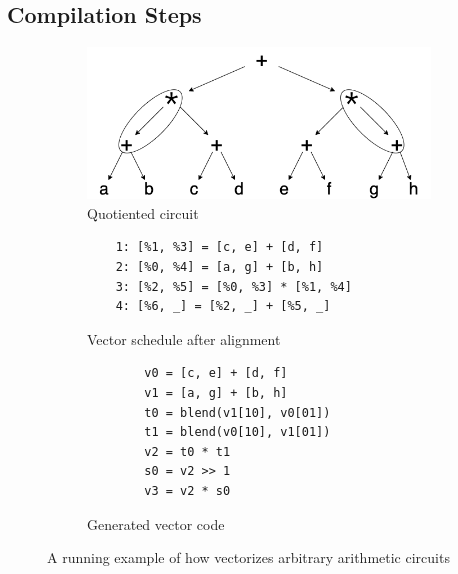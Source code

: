 \subsection*{Compilation Steps}
\begin{figure}
    \begin{subfigure}{0.6\columnwidth}
        \includegraphics[width=0.9\linewidth]{figures/compilation_overview/running_example_quotiented.drawio.png}
        \caption{Quotiented circuit}
        \label{fig:quotient-circuit}
    \end{subfigure}
    \begin{subfigure}{0.45\columnwidth}
        \begin{verbatim}
    1: [%1, %3] = [c, e] + [d, f]
    2: [%0, %4] = [a, g] + [b, h]
    3: [%2, %5] = [%0, %3] * [%1, %4]
    4: [%6, _] = [%2, _] + [%5, _]
        \end{verbatim}
        \caption{Vector schedule after alignment}
        \label{fig:aligned-schedule}
    \end{subfigure}
    \begin{subfigure}{0.45\columnwidth}
        \begin{verbatim}
        v0 = [c, e] + [d, f]
        v1 = [a, g] + [b, h]
        t0 = blend(v1[10], v0[01])
        t1 = blend(v0[10], v1[01])
        v2 = t0 * t1
        s0 = v2 >> 1
        v3 = v2 * s0
        \end{verbatim}
        \caption{Generated vector code}
        \label{fig:generated-code}
    \end{subfigure}
    \caption{A running example of how \system vectorizes arbitrary arithmetic circuits}
    \label{fig:toy-running-example}
\end{figure}

